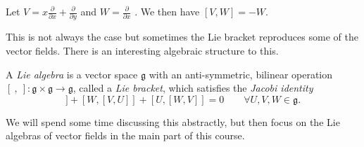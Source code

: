 \begin{example}[]
  Let $V = x \frac{\partial }{\partial x} + \frac{\partial }{\partial y}$  and $W = \frac{\partial }{\partial x}$ . We then have $[V, W] = - W$.
\end{example}
\begin{leftbar}
  This is not always the case but sometimes the Lie bracket reproduces some of the vector fields. There is an interesting algebraic structure to this.
\end{leftbar}
\begin{definition}
  A \emph{Lie algebra} is a vector space $\mathfrak{g}$ with an anti-symmetric, bilinear operation $[\ ,\ ]\colon \mathfrak{g} \times \mathfrak{g} \to \mathfrak{g}$, called a \emph{Lie bracket}, which satisfies the \emph{Jacobi identity}
  \begin{equation}
    [V, [U, W]] + [W, [V, U]] + [U, [W, V]] = 0 \qquad \forall U, V, W \in \mathfrak{g}.
  \end{equation}
\end{definition}
\begin{leftbar}
  We will spend some time discussing this abstractly, but then focus on the Lie algebras of vector fields in the main part of this course.
\end{leftbar}
